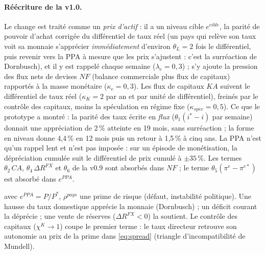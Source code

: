 \documentclass[11pt,a4paper]{article}
\begin{document}
\begin{lecture}
\paragraph{Réécriture de la v1.0.} Le change est traité comme un \emph{prix d'actif} : il a un niveau cible $e^{cible}$, la parité de pouvoir d'achat corrigée du différentiel de taux réel (un pays qui relève son taux voit sa monnaie s'apprécier \emph{immédiatement} d'environ $\theta_L=2$ fois le différentiel, puis revenir vers la PPA à mesure que les prix s'ajustent : c'est la surréaction de Dornbusch), et il y est rappelé chaque semaine ($\lambda_e=0{,}3$) ; s'y ajoute la pression des flux nets de devises $NF$ (balance commerciale plus flux de capitaux) rapportés à la masse monétaire ($\kappa_e=0{,}3$). Les flux de capitaux $KA$ suivent le différentiel de taux réel ($\kappa_K=2$ par an et par unité de différentiel), freinés par le contrôle des capitaux, moins la spéculation en régime fixe ($\kappa_{spec}=0{,}5$). Ce que le prototype a montré : la parité des taux écrite en \emph{flux} ($\theta_1(i^\ast-i)$ par semaine) donnait une appréciation de 2\,\% atteinte en 19 mois, sans surréaction ; la forme en niveau donne 4,4\,\% en 12 mois puis un retour à 1,5\,\% à cinq ans. La PPA n'est qu'un rappel lent et n'est pas imposée : sur un épisode de monétisation, la dépréciation cumulée suit le différentiel de prix cumulé à $\pm35\,\%$. Les termes $\theta_2\,CA$, $\theta_4\,\Delta R^{FX}$ et $\theta_6$ de la v0.9 sont absorbés dans $NF$ ; le terme $\theta_5(\pi^e-\pi^{e\ast})$ est absorbé dans $e^{PPA}$.
\end{lecture}
avec $e^{PPA} = P/P^\ast$, $\rho^{pays}$ une prime de risque (défaut, instabilité politique). Une hausse du taux domestique apprécie la monnaie (Dornbusch) ; un déficit courant la déprécie ; une vente de réserves ($\Delta R^{FX}<0$) la soutient. Le contrôle des capitaux ($\chi^K \to 1$) coupe le premier terme : le taux directeur retrouve son autonomie au prix de la prime dans \eqref{eq:spread} (triangle d'incompatibilité de Mundell).
\end{document}
